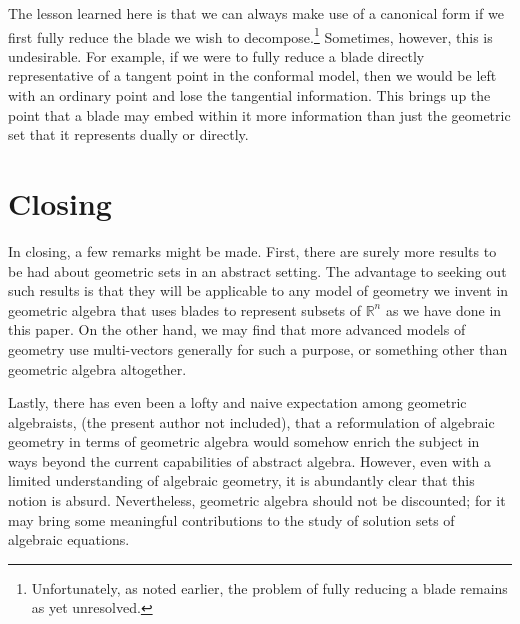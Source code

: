 \documentclass{birkjour}
\theoremstyle{definition}
\theoremstyle{remark}
\numberwithin{equation}{section}
\newcommand{\R}{\mathbb{R}}
\begin{document}
The lesson learned here is that we can always make use of a canonical form if we first
fully reduce the blade we wish to decompose.\footnote{Unfortunately, as noted
earlier, the problem of fully reducing a blade remains as yet unresolved.}  Sometimes, however, this is undesirable.
For example, if we were to fully reduce a blade directly representative of a tangent
point in the conformal model, then we would be left with an ordinary point and lose the tangential information.
This brings up the point that a blade may embed within it more information than just the geometric
set that it represents dually or directly.

\section{Closing}

In closing, a few remarks might be made.  First, there are surely more results to be had
about geometric sets in an abstract setting.  The advantage to seeking out such
results is that they will be applicable to any model of geometry we invent
in geometric algebra that uses blades to represent subsets of $\R^n$ as we have
done in this paper.  On the other hand,
we may find that more advanced models of geometry use multi-vectors generally
for such a purpose, or something other than geometric algebra altogether.

Lastly, there has even been a
lofty and naive expectation among geometric algebraists, (the present author not included),
that a reformulation of algebraic geometry in terms of geometric algebra would somehow enrich the subject
in ways beyond the current capabilities of abstract algebra.  However, even with a limited understanding
of algebraic geometry, it is abundantly clear that this notion is absurd.  Nevertheless,
geometric algebra should not be discounted; for it may bring some meaningful
contributions to the study of solution sets of algebraic equations.
\end{document}
